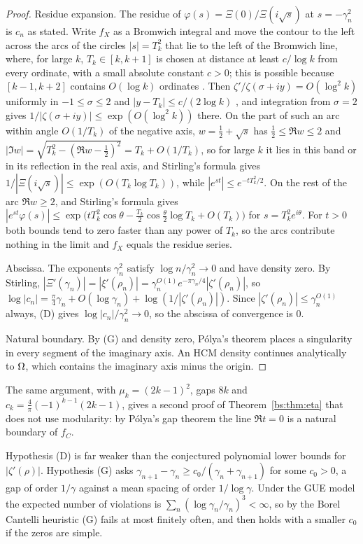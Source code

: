 \begin{proof}
Residue expansion. The residue of $\varphi(s)=\Xi(0)/\Xi(i\sqrt s)$ at $s=-\gamma_n^2$ is $c_n$ as stated. Write $f_X$ as a Bromwich integral and move the contour to the left across the arcs of the circles $|s|=T_k^2$ that lie to the left of the Bromwich line, where, for large $k$, $T_k\in[k,k+1]$ is chosen at distance at least $c/\log k$ from every ordinate, with a small absolute constant $c>0$; this is possible because $[k-1,k+2]$ contains $O(\log k)$ ordinates \cite{HSW22}. Then $\zeta'/\zeta(\sigma+iy)=O(\log^2k)$ uniformly in $-1\le\sigma\le2$ and $|y-T_k|\le c/(2\log k)$ \cite[Theorem 9.6(A) and Section 14.4]{Titchmarsh}, and integration from $\sigma=2$ gives $1/|\zeta(\sigma+iy)|\le\exp(O(\log^2k))$ there. On the part of such an arc within angle $O(1/T_k)$ of the negative axis, $w=\frac12+\sqrt s$ has $\frac12\le\Re w\le2$ and $|\Im w|=\sqrt{T_k^2-(\Re w-\frac12)^2}=T_k+O(1/T_k)$, so for large $k$ it lies in this band or in its reflection in the real axis, and Stirling's formula gives $1/|\Xi(i\sqrt s)|\le\exp(O(T_k\log T_k))$, while $|e^{st}|\le e^{-tT_k^2/2}$. On the rest of the arc $\Re w\ge2$, and Stirling's formula gives $|e^{st}\varphi(s)|\le\exp\bigl(tT_k^2\cos\theta-\frac{T_k}2\cos\frac\theta2\log T_k+O(T_k)\bigr)$ for $s=T_k^2e^{i\theta}$. For $t>0$ both bounds tend to zero faster than any power of $T_k$, so the arcs contribute nothing in the limit and $f_X$ equals the residue series.

Abscissa. The exponents $\gamma_n^2$ satisfy $\log n/\gamma_n^2\to0$ and have density zero. By Stirling, $|\Xi'(\gamma_n)|=|\xi'(\rho_n)|=\gamma_n^{O(1)}e^{-\pi\gamma_n/4}|\zeta'(\rho_n)|$, so $\log|c_n|=\frac\pi4\gamma_n+O(\log\gamma_n)+\log(1/|\zeta'(\rho_n)|)$. Since $|\zeta'(\rho_n)|\le\gamma_n^{O(1)}$ always, (D) gives $\log|c_n|/\gamma_n^2\to0$, so the abscissa of convergence is $0$.

Natural boundary. By (G) and density zero, P\'olya's theorem places a singularity in every segment of the imaginary axis. An HCM density continues analytically to $\Omega$, which contains the imaginary axis minus the origin.
\end{proof}

The same argument, with $\mu_k=(2k-1)^2$, gaps $8k$ and $c_k=\frac4\pi(-1)^{k-1}(2k-1)$, gives a second proof of Theorem~\ref{bs:thm:eta} that does not use modularity: by P\'olya's gap theorem \cite{boPolya23,boPolya} the line $\Re t=0$ is a natural boundary of $f_C$.

\begin{remark}
Hypothesis (D) is far weaker than the conjectured polynomial lower bounds for $|\zeta'(\rho)|$. Hypothesis (G) asks $\gamma_{n+1}-\gamma_n\ge c_0/(\gamma_n+\gamma_{n+1})$ for some $c_0>0$, a gap of order $1/\gamma$ against a mean spacing of order $1/\log\gamma$. Under the GUE model the expected number of violations is $\sum_n(\log\gamma_n/\gamma_n)^3<\infty$, so by the Borel Cantelli heuristic (G) fails at most finitely often, and then holds with a smaller $c_0$ if the zeros are simple.
\end{remark}

